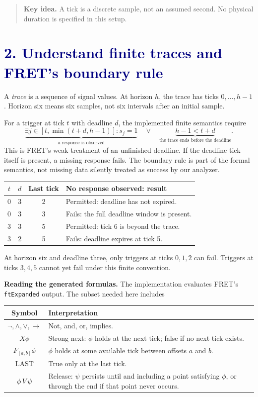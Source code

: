 \documentclass[11pt,a4paper]{article}
\newcommand{\lesson}[2]{\section*{\textcolor{navy}{#1. #2}}}
\newcommand{\key}[1]{\begin{quote}\color{teal}\textbf{Key idea.} #1\end{quote}}
\begin{document}
\key{A tick is a discrete sample, not an assumed second. No physical duration is specified in this setup.}
\newpage

\lesson{2}{Understand finite traces and FRET's boundary rule}
A \emph{trace} is a sequence of signal values. At horizon \(h\), the trace has ticks \(0,\ldots,h-1\). Horizon six means six samples, not six intervals after an initial sample.

For a trigger at tick \(t\) with deadline \(d\), the implemented finite semantics require
\[
\underbrace{\exists j\in[t,\min(t+d,h-1)]:s_j=1}_{\text{a response is observed}}
\quad\lor\quad
\underbrace{h-1<t+d}_{\text{the trace ends before the deadline}}.
\]
This is FRET's weak treatment of an unfinished deadline. If the deadline tick itself is present, a missing response fails. The boundary rule is part of the formal semantics, not missing data silently treated as success by our analyzer.

\begin{center}
\begin{tabular}{cccp{70mm}}
\toprule
\(t\) & \(d\) & Last tick & No response observed: result\\\midrule
0 & 3 & 2 & Permitted: deadline has not expired.\\
0 & 3 & 3 & Fails: the full deadline window is present.\\
3 & 3 & 5 & Permitted: tick 6 is beyond the trace.\\
3 & 2 & 5 & Fails: deadline expires at tick 5.\\\bottomrule
\end{tabular}
\end{center}

At horizon six and deadline three, only triggers at ticks \(0,1,2\) can fail. Triggers at ticks \(3,4,5\) cannot yet fail under this finite convention.

\textbf{Reading the generated formulas.} The implementation evaluates FRET's \texttt{ftExpanded} output. The subset needed here includes
\begin{center}
\begin{tabular}{cp{112mm}}
\toprule
Symbol & Interpretation\\\midrule
\(\neg,\land,\lor,\rightarrow\) & Not, and, or, implies.\\
\(X\phi\) & Strong next: \(\phi\) holds at the next tick; false if no next tick exists.\\
\(F_{[a,b]}\phi\) & \(\phi\) holds at some available tick between offsets \(a\) and \(b\).\\
\(\mathrm{LAST}\) & True only at the last tick.\\
\(\phi\,V\,\psi\) & Release: \(\psi\) persists until and including a point satisfying \(\phi\), or through the end if that point never occurs.\\\bottomrule
\end{tabular}
\end{center}
\end{document}
